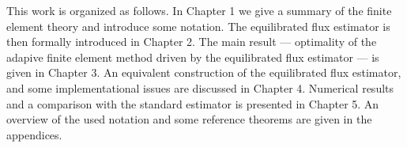 \documentclass[thesis.tex]{subfiles}
\begin{document}
This work is organized as follows.
In Chapter 1 
we give a summary of the finite element theory and introduce some notation. The equilibrated flux estimator is then formally introduced 
in Chapter 2. The main result --- optimality of the adapive finite element method driven by the equilibrated flux estimator --- is 
given in Chapter 3.
 An equivalent construction of the equilibrated flux estimator, and some implementational issues are discussed in Chapter 4. Numerical results and a comparison with the standard estimator is presented
in Chapter 5. An overview of the used notation and some reference theorems are given in the appendices. 
\end{document}
